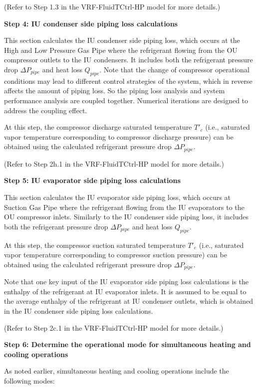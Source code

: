 (Refer to Step 1.3 in the VRF-FluidTCtrl-HP model for more details.)

\textbf{Step 4: IU condenser side piping loss calculations}

This section calculates the IU condenser side piping loss, which occurs at the High and Low Pressure Gas Pipe where the refrigerant flowing from the OU compressor outlets to the IU condensers. It includes both the refrigerant pressure drop $\Delta{P_{pipe}}$ and heat loss $Q_{pipe}$. Note that the change of compressor operational conditions may lead to different control strategies of the system, which in reverse affects the amount of piping loss. So the piping loss analysis and system performance analysis are coupled together. Numerical iterations are designed to address the coupling effect.

At this step, the compressor discharge saturated temperature $T'_c$ (i.e., saturated vapor temperature corresponding to compressor discharge pressure) can be obtained using the calculated refrigerant pressure drop $\Delta{P_{pipe}}$.

(Refer to Step 2h.1 in the VRF-FluidTCtrl-HP model for more details.)

\textbf{Step 5: IU evaporator side piping loss calculations}

This section calculates the IU evaporator side piping loss, which occurs at Suction Gas Pipe where the refrigerant flowing from the IU evaporators to the OU compressor inlets. Similarly to the IU condenser side piping loss, it includes both the refrigerant pressure drop $\Delta{P_{pipe}}$ and heat loss $Q_{pipe}$.

At this step, the compressor suction saturated temperature $T'_e$ (i.e., saturated vapor temperature corresponding to compressor suction pressure) can be obtained using the calculated refrigerant pressure drop $\Delta{P_{pipe}}$.

Note that one key input of the IU evaporator side piping loss calculations is the enthalpy of the refrigerant at IU evaporator inlets. It is assumed to be equal to the average enthalpy of the refrigerant at IU condenser outlets, which is obtained in the IU condenser side piping loss calculations.

(Refer to Step 2c.1 in the VRF-FluidTCtrl-HP model for more details.)

\textbf{Step 6: Determine the operational mode for simultaneous heating and cooling operations}

As noted earlier, simultaneous heating and cooling operations include the following modes:


